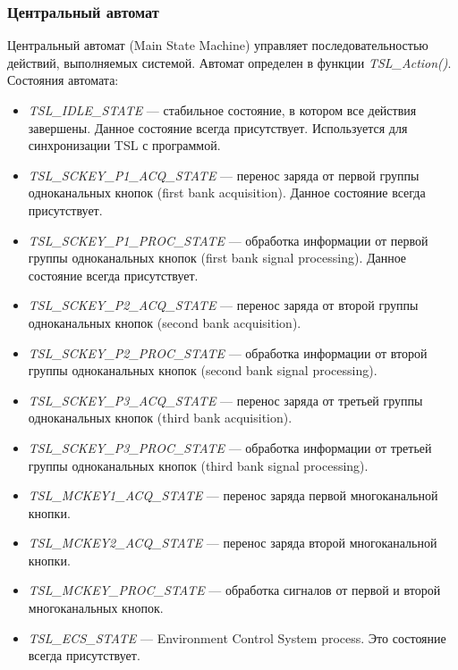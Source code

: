 \subsubsection{Центральный автомат}
Центральный автомат (Main State Machine) управляет последовательностью действий, выполняемых системой.  Автомат определен в функции \textit{TSL\_Action()}. Состояния автомата:\begin{itemize}
\item \textit{TSL\_IDLE\_STATE} --- стабильное состояние, в котором все действия завершены. Данное состояние всегда присутствует. Используется для синхронизации TSL с программой.

\item \textit{TSL\_SCKEY\_P1\_ACQ\_STATE} --- перенос заряда от первой группы одноканальных кнопок (first bank acquisition). Данное состояние всегда присутствует.

\item \textit{TSL\_SCKEY\_P1\_PROC\_STATE} --- обработка информации от первой группы одноканальных кнопок (first bank signal processing). Данное состояние всегда присутствует.

\item \textit{TSL\_SCKEY\_P2\_ACQ\_STATE} --- перенос заряда от второй группы одноканальных кнопок (second bank acquisition).

\item \textit{TSL\_SCKEY\_P2\_PROC\_STATE} --- обработка информации от второй группы одноканальных кнопок (second bank signal processing).

\item \textit{TSL\_SCKEY\_P3\_ACQ\_STATE} --- перенос заряда от третьей группы одноканальных кнопок (third bank acquisition).

\item \textit{TSL\_SCKEY\_P3\_PROC\_STATE} ---  обработка информации от третьей группы одноканальных кнопок (third bank signal processing).

\item \textit{TSL\_MCKEY1\_ACQ\_STATE} --- перенос заряда первой многоканальной кнопки.

\item \textit{TSL\_MCKEY2\_ACQ\_STATE} --- перенос заряда второй многоканальной кнопки.

\item \textit{TSL\_MCKEY\_PROC\_STATE} --- обработка сигналов от первой и второй многоканальных кнопок.

\item \textit{TSL\_ECS\_STATE} --- Environment Control System process. Это состояние всегда присутствует.
\end{itemize}
